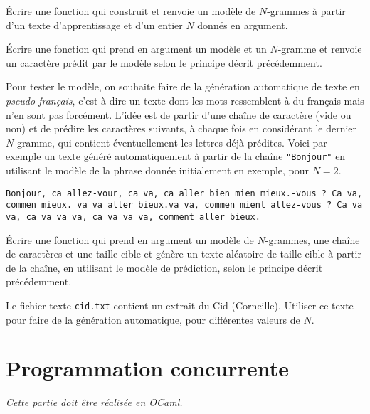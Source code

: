 \documentclass[10pt]{article}
\begin{document}
\begin{Exercise}
Écrire une fonction qui construit et renvoie un modèle de $N$-grammes à partir d'un texte d'apprentissage et d'un entier $N$ donnés en argument.
\end{Exercise}

\begin{Exercise}
Écrire une fonction qui prend en argument un modèle et un $N$-gramme et renvoie un caractère prédit par le modèle selon le principe décrit précédemment.
\end{Exercise}

Pour tester le modèle, on souhaite faire de la génération automatique de texte en \textit{pseudo-français}, c'est-à-dire un texte dont les mots ressemblent à du français mais n'en sont pas forcément. L'idée est de partir d'une chaîne de caractère (vide ou non) et de prédire les caractères suivants, à chaque fois en considérant le dernier $N$-gramme, qui contient éventuellement les lettres déjà prédites. Voici par exemple un texte généré automatiquement à partir de la chaîne \verb|"Bonjour"| en utilisant le modèle de la phrase donnée initialement en exemple, pour $N = 2$.

\begin{minipage}{.95\textwidth}
\texttt{Bonjour, ca allez-vour, ca va, ca aller bien mien mieux.-vous ? Ca va, commen mieux. va va aller bieux.va va, commen mient allez-vous ? Ca va va, ca va va va, ca va va va, comment aller bieux.}
\end{minipage}


\begin{Exercise}
Écrire une fonction qui prend en argument un modèle de $N$-grammes, une chaîne de caractères et une taille cible et génère un texte aléatoire de taille cible à partir de la chaîne, en utilisant le modèle de prédiction, selon le principe décrit précédemment.
\end{Exercise}

\begin{Exercise}
Le fichier texte \verb"cid.txt" contient un extrait du Cid (Corneille). Utiliser ce texte pour faire de la génération automatique, pour différentes valeurs de $N$.
\end{Exercise}

\section{Programmation concurrente}

\textit{Cette partie doit être réalisée en OCaml.}
\end{document}
